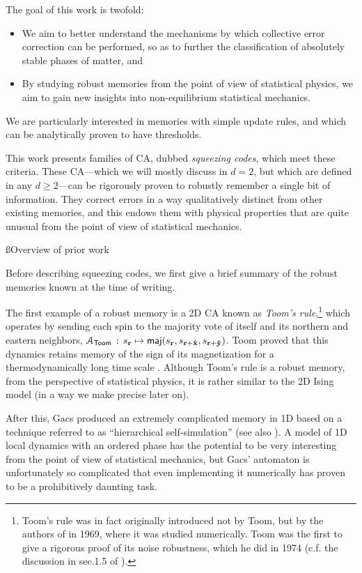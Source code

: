\documentclass[pra,aps,twocolumn,groupedaddress,superscriptaddress,nofootinbib,preprintnumbers]{revtex4-2}
\begin{document}
	The goal of this work is twofold: 
	\begin{itemize}
		\item We aim to better understand the mechanisms by which collective error correction can be performed, so as to further the classification of absolutely stable phases of matter, and 
		\item  By studying robust memories from the point of view of statistical physics, we aim to gain new insights into non-equilibrium statistical mechanics.
	\end{itemize}
	We are particularly interested in memories with simple update rules, and which can be analytically proven to have thresholds. 
	
	This work presents families of CA, dubbed {\it squeezing codes}, which meet these criteria. These CA---which we will mostly discuss in $d=2$, but which are defined in any $d\geq 2$---can be rigorously proven to robustly remember a single bit of information. They correct errors in a way qualitatively distinct from other existing memories, and this endows them with physical properties that are quite unusual from the point of view of statistical mechanics. 
	
	\ss{Overview of prior work} 
	
	Before describing squeezing codes, we first give a brief summary of the robust memories known at the time of writing. 
	
	The first example of a robust memory is a 2D CA known as {\it Toom's rule},\footnote{Toom's rule was in fact originally introduced not by Toom, but by the authors of \cite{vasil1969modelling} in 1969, where it was studied numerically. Toom was the first to give a rigorous proof of its noise robustness, which he did in 1974  \cite{toom1974nonergodic} (c.f. the discussion in sec.1.5 of \cite{swart2022peierls}).} which operates by sending each spin to the majority vote of itself and its northern and eastern neighbors, $\mathcal{A}_{\sf Toom} \, : \, s_{\mathbf{r}} \mapsto {\sf maj}(s_{\mathbf{r}},s_{\mathbf{r}+{\mathbf{\hat x}}},s_{\mathbf{r}+{\mathbf{\hat y}}})$. Toom proved that this dynamics retains memory of the sign of its magnetization for a thermodynamically long time scale \cite{toom1974nonergodic,toom1980stable}. Although Toom's rule is a robust memory, from the perspective of statistical physics, it is rather similar to the 2D Ising model (in a way we make precise later on). 
	
	After this, Gacs produced an extremely complicated memory in 1D based on a technique referred to as ``hierarchical self-simulation'' \cite{gacs2001reliable} (see also \cite{gacs1989self}). A model of 1D local dynamics with an ordered phase has the potential to be very interesting from the point of view of statistical mechanics, but Gacs' automaton is unfortunately so complicated that even implementing it numerically has proven to be a prohibitively daunting task. 
	
\end{document}
